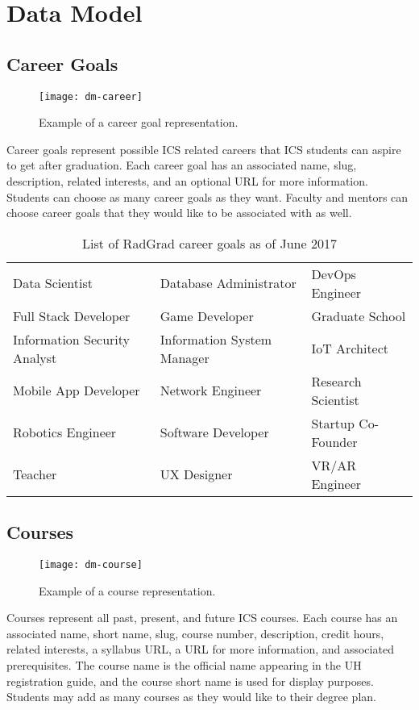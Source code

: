 \section{Data Model}
\subsection{Career Goals}
\begin{figure}[h]
\centering
\texttt{[image: dm-career]}
\caption{Example of a career goal representation.}
\end{figure}
Career goals represent possible ICS related careers that ICS students can aspire to get after graduation. Each career goal has an associated name, slug, description, related interests, and an optional URL for more information. Students can choose as many career goals as they want. Faculty and mentors can choose career goals that they would like to be associated with as well.  

\begin{table}[h!]
\centering
\begin{tabular}{ l l l } 
 Data Scientist & Database Administrator & DevOps Engineer \\ 
 Full Stack Developer & Game Developer & Graduate School \\ 
 Information Security Analyst & Information System Manager & IoT Architect \\ 
 Mobile App Developer & Network Engineer & Research Scientist \\
 Robotics Engineer & Software Developer & Startup Co-Founder \\
 Teacher & UX Designer & VR/AR Engineer 
\end{tabular}
\caption{List of RadGrad career goals as of June 2017}
\label{table:1}
\end{table}

\subsection{Courses}
\begin{figure}[h]
\centering
\texttt{[image: dm-course]}
\caption{Example of a course representation.}
\end{figure}
Courses represent all past, present, and future ICS courses. Each course has an associated name, short name, slug, course number, description, credit hours, related interests, a syllabus URL, a URL for more information, and associated prerequisites. The course name is the official name appearing in the UH registration guide, and the course short name is used for display purposes. Students may add as many courses as they would like to their degree plan. 


